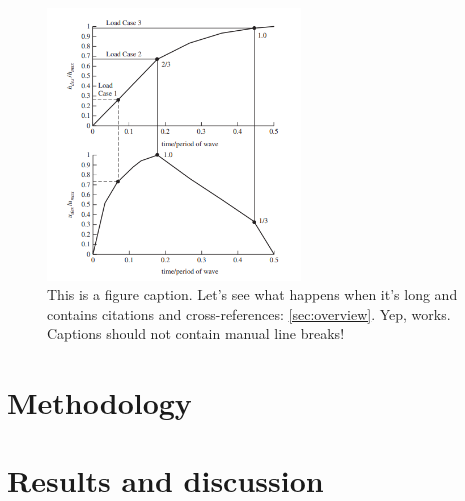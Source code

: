 \documentclass{cup-pan}
\begin{document}
\begin{figure}[H]
\centering
\includegraphics[width=0.6\textwidth]{fig1.png}
\caption{This is a figure caption. Let's see what happens when it's long and contains citations \citep{asce} and cross-references: \ref{sec:overview}. Yep, works. Captions should not contain manual line breaks!}
\label{fig:loadcases}
\end{figure}

\section{Methodology}
\label{sec:method}

\section{Results and discussion}
\label{sec:results}
\end{document}
